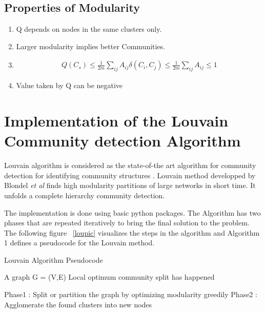 \subsection{Properties of Modularity}
\begin{enumerate}
 \item Q depends on nodes in the same clusters only. 
  \item Larger modularity implies better Communities.
    \item 
    \begin{equation}
    \begin{split}
Q(C_s) \leq \frac{1}{2m} \sum_{ij} A_{ij} \delta(C_i,C_j) \leq \frac{1}{2m} \sum_{ij} A_{ij} \leq 1
\end{split}
    \end{equation}
 \item Value taken by Q can be negative
 \end{enumerate}
 
\section{Implementation of the Louvain Community detection Algorithm}
 Louvain algorithm is considered as the state-of-the art algorithm for community detection for identifying community structures \cite{louvain}. Louvain method developped by Blondel \textit{et al} \cite{louvain} finds high modularity partitions of large networks in short time. It unfolds a complete hierarchy community detection. 
 

\par

  The implementation is done using basic python packages. 
 The Algorithm has two phases that are repeated iteratively to bring the final solution to the problem. The following figure ~\ref{loupic} visualizes the steps in the algorithm and 
 Algorithm 1 defines a pseudocode for the Louvain method. 
\begin{algorithm}[H]
\caption{Louvain Algorithm Pseudocode}
\begin{algorithmic} 
\REQUIRE A graph G = (V,E)
\ENSURE Local optimum community split has happened

\STATE Phase1 : Split or partition the graph by optimizing modularity greedily
\STATE Phase2 : Agglomerate the found clusters into new nodes
\ENDWHILE
\end{algorithmic}
\end{algorithm}



